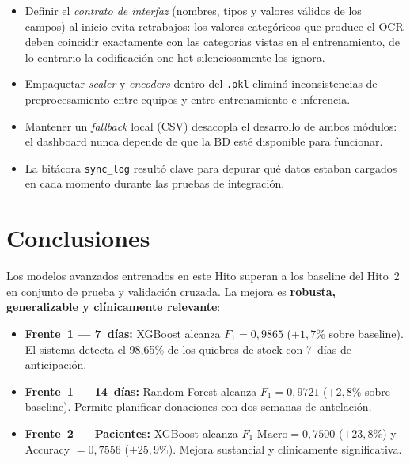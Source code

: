 \documentclass[12pt, a4paper]{article}
\begin{document}
\begin{itemize}[leftmargin=1.6em, itemsep=4pt]
  \item Definir el \emph{contrato de interfaz} (nombres, tipos y valores v\'alidos de los campos) al inicio evita retrabajos: los valores categ\'oricos que produce el OCR deben coincidir exactamente con las categor\'ias vistas en el entrenamiento, de lo contrario la codificaci\'on one-hot silenciosamente los ignora.
  \item Empaquetar \emph{scaler} y \emph{encoders} dentro del \texttt{.pkl} elimin\'o inconsistencias de preprocesamiento entre equipos y entre entrenamiento e inferencia.
  \item Mantener un \emph{fallback} local (CSV) desacopla el desarrollo de ambos m\'odulos: el dashboard nunca depende de que la BD est\'e disponible para funcionar.
  \item La bit\'acora \texttt{sync\_log} result\'o clave para depurar qu\'e datos estaban cargados en cada momento durante las pruebas de integraci\'on.
\end{itemize}

\newpage
\section{Conclusiones}

Los modelos avanzados entrenados en este Hito superan a los baseline del Hito~2 en conjunto de prueba y validaci\'on cruzada. La mejora es \textbf{robusta, generalizable y cl\'inicamente relevante}:

\begin{itemize}[leftmargin=1.5em, itemsep=5pt]
  \item \textbf{Frente~1 --- 7~d\'ias:} XGBoost alcanza $F_1 = 0{,}9865$ ($+1{,}7\%$ sobre baseline). El sistema detecta el 98{,}65\% de los quiebres de stock con 7~d\'ias de anticipaci\'on.
  \item \textbf{Frente~1 --- 14~d\'ias:} Random Forest alcanza $F_1 = 0{,}9721$ ($+2{,}8\%$ sobre baseline). Permite planificar donaciones con dos semanas de antelaci\'on.
  \item \textbf{Frente~2 --- Pacientes:} XGBoost alcanza $F_1\text{-Macro} = 0{,}7500$ ($+23{,}8\%$) y Accuracy $= 0{,}7556$ ($+25{,}9\%$). Mejora sustancial y cl\'inicamente significativa.
\end{itemize}
\end{document}
